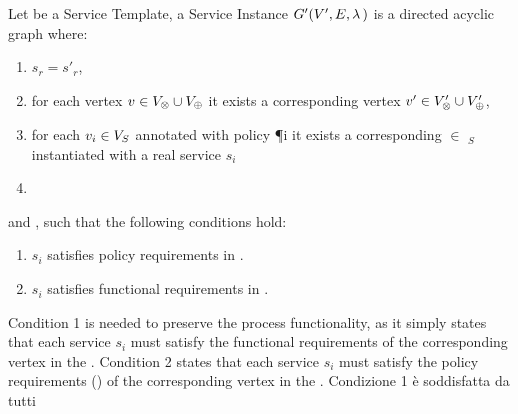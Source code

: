   \begin{definition}\label{def:instance}
    Let \tChartFunction be a Service Template, a Service Instance $G'(V',E,\lambda\,)$ is a directed acyclic graph where:
    \begin{enumerate}[label=\roman*)]
      \item $s_r=s'_r$,
      \item for each vertex $v_{}\in V_{\otimes}\cup V_{\oplus}$ it exists a corresponding vertex $v'_{}\in V'_{\otimes}\cup V'_{\oplus}$,
      \item for each $v_{i}\in V_S$ annotated with policy \P{i} it exists a corresponding $\in$ \Vp$_S$ instantiated with a real service $s_i$
      \item
    \end{enumerate}
    and , such that the following conditions hold:
    \begin{enumerate}[label=\arabic*)]
      \item $s_i$ satisfies policy requirements in \tChartFunction.
      \item $s_i$ satisfies functional requirements  in \tChartFunction.
    \end{enumerate}
  \end{definition}

  Condition 1 is needed to preserve the process functionality, as it simply states that each service $s_i$ must satisfy the functional requirements of the corresponding vertex in the \pipelineTemplate.
  Condition 2 states that each service $s_i$ must satisfy the policy requirements \myLambda() of the corresponding vertex  in the \pipelineTemplate.
  Condizione 1 è soddisfatta da tutti


